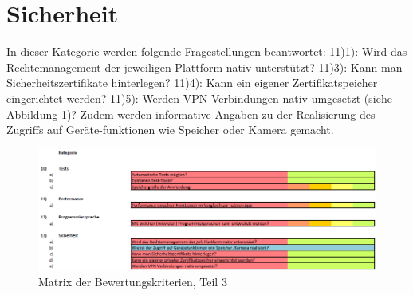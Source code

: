 \section{Sicherheit}

In dieser Kategorie werden folgende Fragestellungen beantwortet: 11)1): Wird das Rechtemanagement der jeweiligen Plattform nativ unterstützt? 11)3): Kann man Sicherheitszertifikate hinterlegen? 11)4): Kann ein eigener Zertifikatspeicher eingerichtet werden? 11)5): Werden VPN Verbindungen nativ umgesetzt (siehe Abbildung \ref{fig:Bewertungskriterien_3})? Zudem werden informative Angaben zu der Realisierung des Zugriffs auf Geräte-funktionen wie Speicher oder Kamera gemacht.  

\begin{figure}[h]
	\centering
	\includegraphics[width=1\textwidth]{Bilder/Bewertungsmatrix_3.PNG}
	\caption{Matrix der Bewertungskriterien, Teil 3}
	\label{fig:Bewertungskriterien_3}
\end{figure}